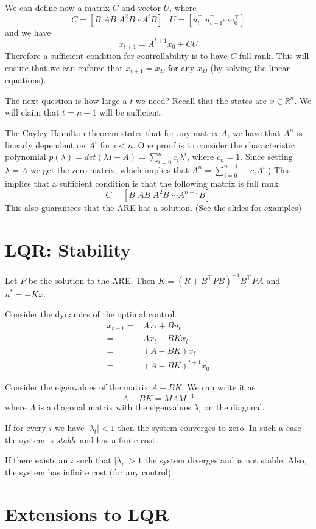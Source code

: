 We can define now a matrix $C$ and vector $U$, where
\[
C=[ B\; AB\; A^2B \cdots A^t B] \;\;\; U=[u_t^\top \;u_{t-1}^\top
\cdots u_0^\top]
\]
and we have
\[
x_{t+1}=A^{t+1}x_0 +CU
\]
Therefore a sufficient condition for controllability is to have $C$
full rank. This will ensure that we can enforce that $x_{t+1}=x_D$
for any $x_D$ (by solving the linear equations).

The next question is how large a $t$  we need? Recall that the
states are $x\in \mathbb{R}^n$. We will claim that $t=n-1$ will be
sufficient.

The Cayley-Hamilton theorem states that for any matrix $A$, we have
that $A^n$ is linearly dependent on $A^i$ for $i<n$. One proof is to
consider the characteristic polynomial $p(\lambda)=det(\lambda I
-A)=\sum_{i=0}^n c_i \lambda^i$, where $c_n=1$. Since setting
$\lambda=A$ we get the zero matrix, which implies that
$A^n=\sum_{i=0}^{n-1}-c_i A^i$.) This implies that a sufficient
condition is that the following matrix is full rank
\[
C=[ B\; AB\; A^2B\; \cdots A^{n-1} B]
\]
This also guarantees that the ARE has a solution. (See the slides
for examples)

\section{LQR: Stability}

Let $P$ be the solution to the ARE. Then $K=(R+B^\top P
B)^{-1}B^\top PA$ and $u^*=-Kx$.

Consider the dynamics of the optimal control.
\begin{align*}
x_{t+1} =& Ax_t + Bu_t\\
=& Ax_t -BKx_t\\
=& (A-BK)x_t\\
=&(A-BK)^{t+1}x_0
\end{align*}

Consider the eigenvalues of the matrix $A-BK$. We can write it as
\[
A-BK=M\Lambda M^{-1}
\]
where $\Lambda$ is a diagonal matrix with the eigenvalues
$\lambda_i$ on the diagonal.

If for every $i$ we have $|\lambda_i|<1$ then the system converges
to zero. In such a case the system is {\em stable} and has a finite
cost.

If there exists an $i$ such that $|\lambda_i|>1$ the system diverges
and is not stable. Also, the system has infinite cost (for any
control).

\section{Extensions to LQR}

